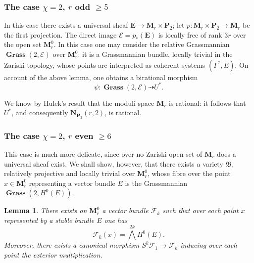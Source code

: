\documentclass[12pt,english]{smfart}%
\theoremstyle{plain}
\newtheorem{lemma}[theorem]{Lemma}
\theoremstyle{definition}
\theoremstyle{remark}
\newcommand{\PP}{\mathbf{P}}
\newcommand{\NN}{\mathbf{N}}           %
\newcommand{\MM}{\mathbf{M}}           %
\DeclareMathOperator{\Grass}{\mathbf{Grass}}
\newcommand{\origpage}[1]{\marginnote{\scriptsize\itshape p.~#1}}
\begin{document}
\subsubsection*{The case $\chi=2$, $r$ odd $\ge 5$}

In this case there exists a universal sheaf $\mathbf{E}\to \MM_r\times\PP_2$; let $p:\MM_r\times\PP_2\to\MM_r$ be the first projection. The direct image
\origpage{677}%
$\mathscr{E}=p_*(\mathbf{E})$ is locally free of rank $3r$ over the open set $\MM^0_r$. In this case one may consider the relative Grassmannian $\Grass(2,\mathscr{E})$ over $\MM^0_r$: it is a Grassmannian bundle, locally trivial in the Zariski topology, whose points are interpreted as coherent systems $(\Gamma^{*},E)$. On account of the above lemma, one obtains a birational morphism
\[
\psi : \Grass(2,\mathscr{E})\dashrightarrow U^{*}.
\]

We know by Hulek's result \cite{Hul} that the moduli space $\MM_r$ is rational: it follows that $U^{*}$, and consequently $\NN_{\PP_2}(r,2)$, is rational.

\subsubsection*{The case $\chi=2$, $r$ even $\ge 6$}

This case is much more delicate, since over no Zariski open set of $\MM_r$ does a universal sheaf exist. We shall show, however, that there exists a variety $\mathfrak{B}$, relatively projective and locally trivial over $\MM^0_r$, whose fibre over the point $x\in\MM^0_r$ representing a vector bundle $E$ is the Grassmannian $\Grass(2,H^0(E))$.

\begin{lemma}\label{lem:Fk}
There exists on $\MM^0_r$ a vector bundle $\mathscr{F}_k$ such that over each point $x$ represented by a stable bundle $E$ one has
\[
\mathscr{F}_k(x) = \textstyle\bigwedge^{2k}H^0(E).
\]
Moreover, there exists a canonical morphism $S^k\mathscr{F}_1\to\mathscr{F}_k$ inducing over each point the exterior multiplication.
\end{lemma}
\end{document}
